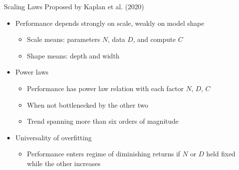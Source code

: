 \begin{vbframe}{Scaling Laws Proposed by Kaplan et al. (2020)}
\href{https://arxiv.org/abs/2001.08361}{} 

\vfill

\begin{itemize}

	\item Performance depends strongly on scale, weakly on model shape
	\begin{itemize}
	\item Scale means: parameters $N$, data $D$, and compute $C$
	\item Shape means: depth and width
	\end{itemize}

	\item Power laws
	\begin{itemize}
	\item Performance has power law relation with each factor $N$, $D$, $C$
	\item When not bottlenecked by the other two 
	\item Trend spanning more than six orders of magnitude
	\end{itemize}

	\item Universality of overfitting 
	\begin{itemize}
	\item Performance enters regime of diminishing returns if $N$ or $D$ held fixed while the other increases
	\end{itemize}

\end{itemize}

\vfill

\end{vbframe}



